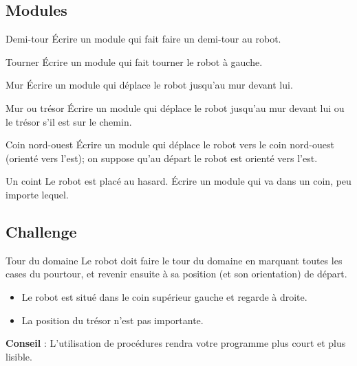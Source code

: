 	\subsection{Modules}

		\begin{Exercice}{Demi-tour}
			Écrire un module qui fait faire un demi-tour au robot.
		\end{Exercice}

		\begin{Exercice}{Tourner}
			Écrire un module qui fait tourner le robot à gauche.
		\end{Exercice}

		\begin{Exercice}{Mur}
			Écrire un module qui déplace le robot
			jusqu'au mur devant lui.
		\end{Exercice}

		\begin{Exercice}{Mur ou trésor}
			Écrire un module qui déplace le robot jusqu'au mur
			devant lui ou le trésor s'il est sur le chemin.
		\end{Exercice}

		\begin{Exercice}{Coin nord-ouest}
			Écrire un module qui déplace le robot vers le coin nord-ouest 
			(orienté vers l'est); on suppose qu'au départ
			le robot est orienté vers l'est.
		\end{Exercice}

		\begin{Exercice}{Un coint}
			Le robot est placé au hasard. Écrire un module qui va dans un coin, peu
			importe lequel. 
		\end{Exercice}

	\subsection{Challenge}

		\begin{Exercice}{Tour du domaine}
			Le robot doit faire le tour du domaine en marquant toutes les cases du
			pourtour, et revenir ensuite à sa position (et son orientation) de
			départ.

			\begin{itemize}
			\item Le robot est situé dans le coin supérieur gauche et regarde à droite.
			\item La position du trésor n'est pas importante.
			\end{itemize}

			\textbf{Conseil} : L'utilisation de procédures rendra
			votre programme plus court et plus lisible.
		\end{Exercice}


